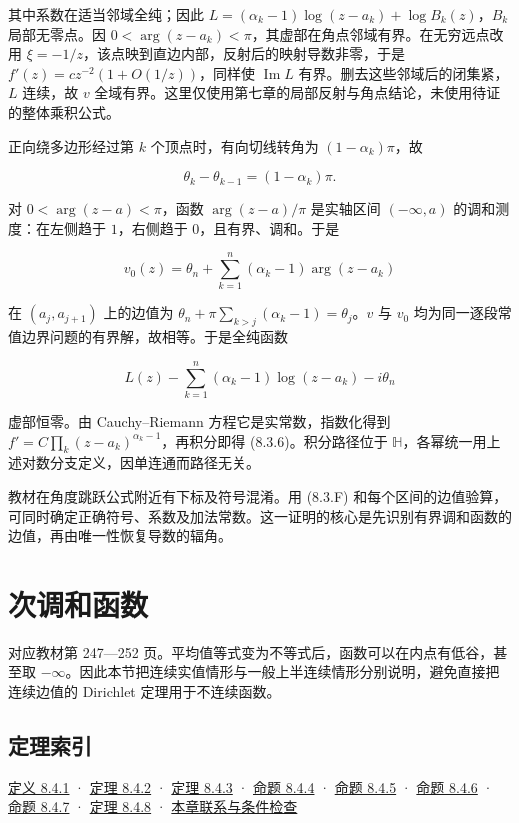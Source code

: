 \documentclass[11pt,a4paper]{article}
\begin{document}
其中系数在适当邻域全纯；因此
\(L=(\alpha_k-1)\log(z-a_k)+\log B_k(z)\)，\(B_k\) 局部无零点。因
\(0<\arg(z-a_k)<\pi\)，其虚部在角点邻域有界。在无穷远点改用
\(\xi=-1/z\)，该点映到直边内部，反射后的映射导数非零，于是
\(f'(z)=c z^{-2}(1+O(1/z))\)，同样使 \(\operatorname{Im}L\)
有界。删去这些邻域后的闭集紧，\(L\) 连续，故 \(v\)
全域有界。这里仅使用第七章的局部反射与角点结论，未使用待证的整体乘积公式。

正向绕多边形经过第 \(k\) 个顶点时，有向切线转角为
\((1-\alpha_k)\pi\)，故

\[
\theta_k-\theta_{k-1}=(1-\alpha_k)\pi.\tag{8.3.F}
\]

对 \(0<\arg(z-a)<\pi\)，函数 \(\arg(z-a)/\pi\) 是实轴区间
\((-\infty,a)\) 的调和测度：在左侧趋于 \(1\)，右侧趋于
\(0\)，且有界、调和。于是

\[
v_0(z)=\theta_n+\sum_{k=1}^n(\alpha_k-1)\arg(z-a_k)\tag{8.3.G}
\]

在 \((a_j,a_{j+1})\) 上的边值为
\(\theta_n+\pi\sum_{k>j}(\alpha_k-1)=\theta_j\)。\(v\) 与 \(v_0\)
均为同一逐段常值边界问题的有界解，故相等。于是全纯函数

\[
L(z)-\sum_{k=1}^n(\alpha_k-1)\log(z-a_k)-i\theta_n
\]

虚部恒零。由 Cauchy--Riemann 方程它是实常数，指数化得到
\(f'=C\prod_k(z-a_k)^{\alpha_k-1}\)，再积分即得 (8.3.6)。积分路径位于
\(\mathbb H\)，各幂统一用上述对数分支定义，因单连通而路径无关。

教材在角度跳跃公式附近有下标及符号混淆。用 (8.3.F)
和每个区间的边值验算，可同时确定正确符号、系数及加法常数。这一证明的核心是先识别有界调和函数的边值，再由唯一性恢复导数的辐角。

\section{次调和函数}
对应教材第 247---252
页。平均值等式变为不等式后，函数可以在内点有低谷，甚至取
\(-\infty\)。因此本节把连续实值情形与一般上半连续情形分别说明，避免直接把连续边值的
Dirichlet 定理用于不连续函数。

\subsection*{定理索引}\label{ch08-s4-heading-1}

\hyperref[ch08-s4-heading-2]{定义 8.4.1} · \hyperref[ch08-s4-heading-3]{定理 8.4.2} ·
\hyperref[ch08-s4-heading-4]{定理 8.4.3} · \hyperref[ch08-s4-heading-5]{命题 8.4.4} ·
\hyperref[ch08-s4-heading-6]{命题 8.4.5} · \hyperref[ch08-s4-heading-7]{命题 8.4.6} ·
\hyperref[ch08-s4-heading-8]{命题 8.4.7} · \hyperref[ch08-s4-heading-9]{定理 8.4.8} ·
\hyperref[ch08-s4-heading-10]{本章联系与条件检查}
\end{document}
